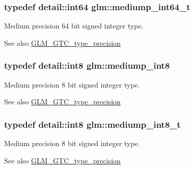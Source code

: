 \subsubsection[{mediump\+\_\+int64\+\_\+t}]{\setlength{\rightskip}{0pt plus 5cm}typedef detail\+::int64 {\bf glm\+::mediump\+\_\+int64\+\_\+t}}\label{group__gtc__type__precision_ga555a2f85641550c232db473a9bb981f7}
Medium precision 64 bit signed integer type. \begin{DoxySeeAlso}{See also}
\hyperlink{group__gtc__type__precision}{G\+L\+M\+\_\+\+G\+T\+C\+\_\+type\+\_\+precision} 
\end{DoxySeeAlso}
\hypertarget{group__gtc__type__precision_ga3ee8faab2278c44c5785af04b7b18a14}{}
\subsubsection[{mediump\+\_\+int8}]{\setlength{\rightskip}{0pt plus 5cm}typedef detail\+::int8 {\bf glm\+::mediump\+\_\+int8}}\label{group__gtc__type__precision_ga3ee8faab2278c44c5785af04b7b18a14}
Medium precision 8 bit signed integer type. \begin{DoxySeeAlso}{See also}
\hyperlink{group__gtc__type__precision}{G\+L\+M\+\_\+\+G\+T\+C\+\_\+type\+\_\+precision} 
\end{DoxySeeAlso}
\hypertarget{group__gtc__type__precision_ga626ac5f73d3538e62a879d6c56abfb36}{}
\subsubsection[{mediump\+\_\+int8\+\_\+t}]{\setlength{\rightskip}{0pt plus 5cm}typedef detail\+::int8 {\bf glm\+::mediump\+\_\+int8\+\_\+t}}\label{group__gtc__type__precision_ga626ac5f73d3538e62a879d6c56abfb36}
Medium precision 8 bit signed integer type. \begin{DoxySeeAlso}{See also}
\hyperlink{group__gtc__type__precision}{G\+L\+M\+\_\+\+G\+T\+C\+\_\+type\+\_\+precision} 
\end{DoxySeeAlso}
\hypertarget{group__gtc__type__precision_ga6745262ef6a6fdb8637b2387ef924828}{}
